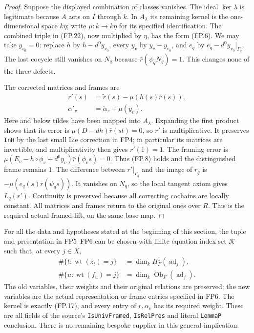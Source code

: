 \begin{proof}
Suppose the displayed combination of classes vanishes.
The ideal $\ker\lambda$ is legitimate because $A$ acts on $I$
through $k$.  In $A_\lambda$ its remaining kernel is the
one-dimensional space $k\eta$; write $\mu:k\to k\eta$ for its
specified identification.
The combined triple in (FP.22), now multiplied by $\eta$, has
the form (FP.6).  We may take $y_{v_0}=0$:
replace $h$ by $h-d^0y_{v_0}$, every $y_v$ by $y_v-y_{v_0}$,
and $e_q$ by $e_q-d^0y_{v_0}|_{\Gamma_q}$.
The last cocycle still vanishes on $N_q$ because
$\bar r(\psi_qN_q)=1$.
This changes none of the three defects.

The corrected matrices and frames are
\[
 \begin{split}
 r'(s)&=\widetilde r(s)-\mu(h(s)\bar r(s)),\\
 \alpha'_v&=\widetilde\alpha_v+\mu(y_v).
 \end{split}
 \tag{FP.24}
\]
Here and below tildes have been mapped into $A_\lambda$.
Expanding the first product shows that its error is
$\mu(D-dh)\bar r(st)=0$, so $r'$ is multiplicative.
It preserves \texttt{InH} by the last small Lie correction in
FP4; in particular its matrices are invertible, and multiplicativity
then gives $r'(1)=1$.
The framing error is
$\mu(E_v-h\circ\phi_v+d^0y_v)\bar r(\phi_vs)=0$.
Thus (FP.8) holds and the distinguished frame remains $1$.
The difference between $r'|_{\Gamma_q}$ and the image of $r_q$
is $-\mu(e_q(s)\bar r(\psi_qs))$.
It vanishes on $N_q$, so the local tangent axiom gives $L_q(r')$.
Continuity is preserved because all correcting cochains are
locally constant.
All matrices and frames return to the original ones over $R$.
This is the required actual framed lift, on the same base map.
\end{proof}

\begin{theorem}
\label{claim:FP8}
For all the data and hypotheses stated at the beginning of this
section, the tuple and presentation in FP5--FP6 can be chosen with
finite equation index set $\mathcal K$ such that, at every $j\in X$,
\[
 \begin{split}
 \#\{t:\operatorname{wt}(z_t)=j\}
      &=\dim_kH^1_F(\operatorname{ad}_j),\\
 \#\{u:\operatorname{wt}(f_u)=j\}
      &=\dim_k\operatorname{Ob}_F(\operatorname{ad}_j).
 \end{split}
 \tag{FP.25}
\]
The old variables, their weights and their original relations are
preserved; the new variables are the actual representation or frame
entries specified in FP6.  The kernel is exactly (FP.17), and every
entry of $r,\alpha_v$ has its required weight.
These are all fields of the source's \texttt{IsUnivFramed},
\texttt{IsRelPres} and literal \texttt{LemmaP} conclusion.
There is no remaining bespoke supplier in this general implication.
\end{theorem}

